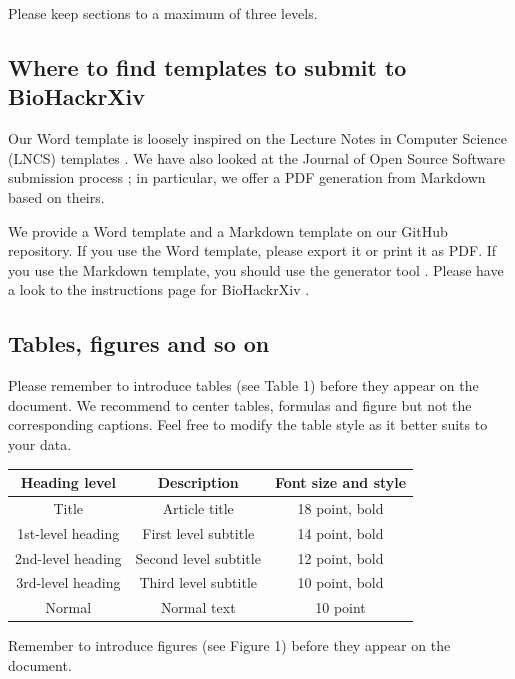 \documentclass[a4paper,10pt]{article}
\begin{document}
Please keep sections to a maximum of three levels.

\subsection{Where to find templates to submit to
BioHackrXiv}\label{where-to-find-templates-to-submit-to-biohackrxiv}

Our Word template is loosely inspired on the Lecture Notes in Computer Science (LNCS) templates \cite{lncs_springer_conference_nodate}. We have also looked at the Journal of Open Source Software submission process \cite{joss_submitting_2017}; in
particular, we offer a PDF generation from Markdown based on theirs.

We provide a Word template and a Markdown template on our GitHub repository. If you use the Word template, please export it or print it as PDF. If you use the Markdown template, you should use the generator tool \cite{joss_whedon_nodate}. Please have a look to the instructions page for BioHackrXiv \cite{prins_submitting_2020}.

\subsection{Tables, figures and so on}\label{tables-figures-and-so-on}

Please remember to introduce tables (see Table 1) before they appear on the document. We recommend to center tables, formulas and figure but not the corresponding captions. Feel free to modify the table style as it better suits to your data.


\begin{center}
 \begin{tabular}{c c c } 
 \hline\hline
 Heading level & Description & Font size and style \\
 \hline
 Title	& Article title & 18 point, bold \\
 1st-level heading & First level subtitle & 14 point, bold \\
 2nd-level heading & Second level subtitle & 12 point, bold \\
 3rd-level heading & Third level subtitle & 10 point, bold \\
 Normal & Normal text & 10 point \\
 \hline
\end{tabular}
\end{center}



Remember to introduce figures (see Figure 1) before they appear on the document.
\end{document}
